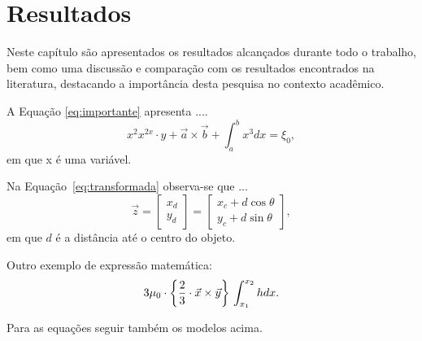 \chapter{Resultados} \label{resultado}

Neste capítulo são apresentados os resultados alcançados durante todo o trabalho, bem como uma discussão  e comparação com os resultados encontrados na literatura, destacando a importância desta pesquisa no contexto acadêmico.

A Equação \ref{eq:importante}
apresenta ....
%
\begin{equation}
\label{eq:importante}
    x^2      x^{2x} \cdot y + \vec{a}\times \vec{b} + \int_{a}^{b}x^3 dx = \xi_0 ,
\end{equation}
em que x é uma variável.

Na Equação~\ref{eq:transformada} observa-se que ...
%
\begin{equation}
\label{eq:transformada}
\vec{z} = \begin{bmatrix}
x_d 
\\ 
y_d 
\end{bmatrix} = \begin{bmatrix}
x_c + d\cos\theta
\\ 
y_c + d\sin\theta 
\end{bmatrix},
\end{equation}
em que $d$ é a distância até o centro do objeto.

Outro exemplo de expressão matemática:
%
\begin{equation}
   3\mu_0 \cdot \left \{ \frac{2}{3} \cdot \vec{x}\times \vec{y} \right \} \\
   \int_{x_1}^{x_2}hdx .
\end{equation}

Para as equações seguir também os modelos acima.

